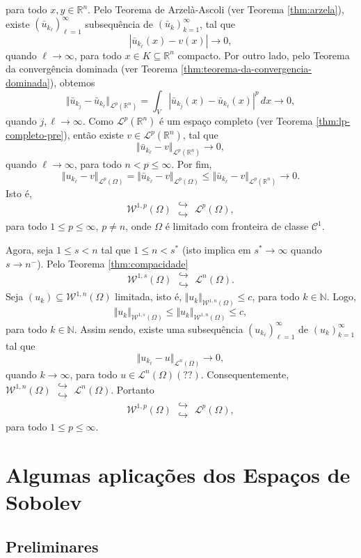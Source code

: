 \documentclass[a4paper, 11pt]{book}
\theoremstyle{definition}
\newcommand{\bN}{\mathbb{N}}
\newcommand{\bR}{\mathbb{R}}
\newcommand{\cC}{\mathcal{C}}
\newcommand{\cL}{\mathcal{L}}
\newcommand{\cW}{\mathcal{W}}
\newcommand{\doublehookrightarrow}{\;\substack{\hookrightarrow \\ \hookrightarrow}\;}
\begin{document}
para todo $x,y \in \bR^n$.
Pelo Teorema de Arzelà-Ascoli (ver Teorema \ref{thm:arzela}), existe $(\bar u_{k_\ell})_{\ell=1}^\infty$ subsequência de $(\bar u_k)_{k=1}^\infty$, tal que
\[
    |\bar u_{k_\ell}(x) - v(x)| \to 0,
\]
quando $\ell \to \infty$, para todo $x \in K \subseteq \bR^n$ compacto.
Por outro lado, pelo Teorema da convergência dominada (ver Teorema \ref{thm:teorema-da-convergencia-dominada}), obtemos
\[
    \Vert \bar u_{k_j} - \bar u_{k_\ell} \Vert_{\cL^p(\bR^n)} = \int_{V} |\bar u_{k_j}(x) - \bar u_{k_\ell}(x)|^p \,dx \to 0,
\]
quando $j,\ell \to \infty$.
Como $\cL^p(\bR^n)$ é um espaço completo (ver Teorema \ref{thm:lp-completo-pre}), então existe $v \in \cL^p(\bR^n)$, tal que
\[
    \Vert \bar u_{k_\ell} - v \Vert_{\cL^p(\bR^n)} \to 0,
\]
quando $\ell \to \infty$, para todo $n < p \leqslant \infty$.
Por fim,
\[
    \Vert u_{k_\ell} - v \Vert_{\cL^p(\Omega)} = \Vert \bar u_{k_\ell} - v \Vert_{\cL^p(\Omega)} \leqslant \Vert \bar u_{k_\ell} - v \Vert_{\cL^p(\bR^n)} \to 0.
\]
Isto é,
\[
    \cW^{1,p}(\Omega) \doublehookrightarrow \cL^p(\Omega),
\]
para todo $1 \leqslant p \leqslant \infty$, $p \neq n$, onde $\Omega$ é limitado com fronteira de classe $\cC^1$.

Agora, seja $1 \leqslant s < n$ tal que $1 \leqslant n < s^*$ (isto implica em $s^* \to \infty$ quando $s \to n^-$).
Pelo Teorema \ref{thm:compacidade}
\[
    \cW^{1,s}(\Omega) \doublehookrightarrow \cL^n(\Omega).
\]
Seja $(u_k) \subseteq \cW^{1,n}(\Omega)$ limitada, isto é, $\Vert u_k \Vert_{\cW^{1,n}(\Omega)} \leqslant c$, para todo $k \in \bN$.
Logo,
\[
    \Vert u_k \Vert_{\cW^{1,s}(\Omega)} \leqslant \Vert u_k \Vert_{\cW^{1,n}(\Omega)} \leqslant c,
\]
para todo $k \in \bN$.
Assim sendo, existe uma subsequência $(u_{k_\ell})_{\ell=1}^\infty$ de $(u_k)_{k=1}^\infty$ tal que
\[
    \Vert u_{k_\ell} - u \Vert_{\cL^n(\Omega)} \to 0,
\]
quando $k \to \infty$, para todo $u \in \cL^n(\Omega) (??)$.
Consequentemente, $\cW^{1,n}(\Omega) \doublehookrightarrow \cL^n(\Omega)$.
Portanto
\[
    \cW^{1,p}(\Omega) \doublehookrightarrow \cL^p(\Omega),
\]
para todo $1 \leqslant p \leqslant \infty$.

\chapter{Algumas aplicações dos Espaços de Sobolev}

\section{Preliminares}
\end{document}
